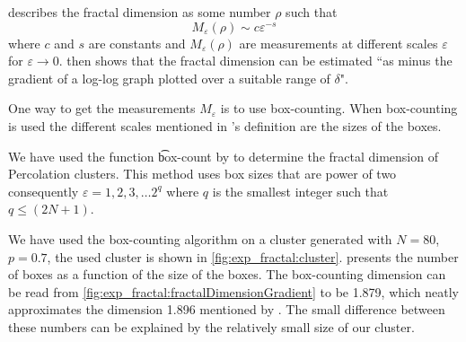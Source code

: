 \textcite{falconer2004fractal} describes the fractal dimension as some number $\rho$ such that
\begin{equation}
	M_\varepsilon(\rho) \sim c\varepsilon^{-s}
\end{equation}
where $c$ and $s$ are constants and $M_\varepsilon(\rho)$ are measurements at different scales $\varepsilon$ for $\varepsilon \to 0$. \citeauthor{falconer2004fractal} then shows that the fractal dimension can be estimated ``as minus the gradient of a log-log graph plotted over a suitable range of $\delta$"\cite{falconer2004fractal}.

One way to get the measurements $M_\varepsilon$ is to use box-counting. When box-counting is used the different scales mentioned in \citeauthor{falconer2004fractal}'s definition are the sizes of the boxes. 

We have used the function \t{box-count} by \textcite{boxCounting} to determine the fractal dimension of Percolation clusters. This method uses box sizes that are power of two consequently $\varepsilon = 1, 2, 3, \dotsc 2^q$ where $q$ is the smallest integer such that $q \leq (2N + 1)$. 

We have used the box-counting algorithm on a cluster generated with $N = 80$, $p = 0.7$, the used cluster is shown in \cref{fig:exp_fractal:cluster}.  presents the number of boxes as a function of the size of the boxes. The box-counting dimension can be read from \cref{fig:exp_fractal:fractalDimensionGradient} to be \num{1.879}, which neatly approximates the dimension \num{1.896} mentioned by \textcite{stauffer1994introduction}. The small difference between these numbers can be explained by the relatively small size of our cluster. 

